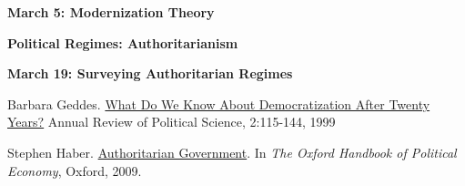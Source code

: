 \documentclass[letterpaper]{article}
\renewenvironment{itemize}{
  \begin{list}{}{
    \setlength{\leftmargin}{1.5em}
  }
}{
  \end{list}
}
\begin{document}
\begin{enumerate}
\begin{itemize} {\bf March 5: Modernization Theory}
\begin{itemize}
				\end{itemize}

	\end{itemize}







\item {\bf Political Regimes: Authoritarianism}
\begin{itemize}	
	\item {\bf March 19: Surveying Authoritarian Regimes}
			\begin{itemize}
				\item[$\bullet$] Barbara Geddes. \href{https://www.annualreviews.org/doi/pdf/10.1146/annurev.polisci.2.1.115}{What Do We Know About Democratization After Twenty Years?} Annual Review of Political Science, 2:115-144, 1999
				

				\item[$\bullet$] Stephen Haber. \href{http://www.oxfordhandbooks.com/oxford/downloaddoclightbox/$002f10.1093$002foxfordhb$002f9780199548477.001.0001$002foxfordhb-9780199548477-e-038/Authoritarian$0020Government;jsessionid=2E89E3A5EE542CF1CE7583F64EFD4C17?nojs=true}{Authoritarian Government}. In \emph{The Oxford Handbook of Political Economy}, Oxford, 2009. 
			\end{itemize}



\end{itemize}
\end{enumerate}
\end{document}
